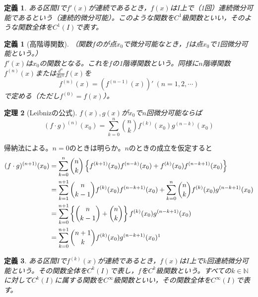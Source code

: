 \documentclass[dvipdfmx,a4j,10pt]{jsarticle}
\makeatletter
\theoremstyle{mystyle1}
\newtheorem{dfn}{定義}[part]
\newtheorem{thm}[dfn]{定理}
\theoremstyle{mystyle2}
\newtheorem{dfn*}{定義}
\renewenvironment{proof}[1][\proofname]{\par
  \pushQED{\qed}%
  \normalfont
  \topsep6\p@\@plus6\p@ \trivlist
  \item[\hskip\labelsep{\bfseries\sffamily #1}]\ignorespaces
}{%
  \popQED\endtrivlist\@endpefalse
}
\renewcommand\proofname{証明}
\makeatother
\begin{document}
\begin{framed}
\begin{dfn}\label{def7.5}
ある区間$I$で$f'(x)$が連続であるとき，$f(x)$は$I$上で（1回）連続微分可能であるという（連続的微分可能）。このような関数を$C^1$級関数といい，そのような関数全体を$C^1(I)$で表す。
\end{dfn}
\end{framed}
\begin{dfn*}[高階導関数]（関数$f$のが点$x_0$で微分可能なとき，$f$は点$x_0$で1回微分可能という。）\\
    $f'(x)$は$x_0$の関数となる。これを$f$の1階導関数という。同様に$n$階導関数$f^{(n)}(x)$または$\displaystyle \frac{d^n}{dx^n}f(x)$を
    \[
    f^{(n)}(x)=(f^{(n-1)}(x))'\ (n=1,2,\cdots)
    \]
    で定める（ただし$f^{(0)}=f(x)$）。
\end{dfn*}

\begin{framed}
    \begin{thm}[Leibnizの公式]\label{thm7.6}
        $f(x),g(x)$が$x_0$で$n$回微分可能ならば
        \[
        (f\cdot g)^{(n)}(x_0)=\sum_{k=0}^{n}\binom{n}{k}f^{(k)}(x_0)g^{(n-k)}(x_0)
        \]
    \end{thm}
\end{framed}

\begin{proof}[定理\ref{thm7.6}の証明]
    帰納法による。$n=0$のときは明らか。$n$のときの成立を仮定すると
    \[
    \begin{split}
    (f\cdot g)^{(n+1)}(x_0)
    &=\sum_{k=0}^{n}\binom{n}{k}\left\{f^{(k+1)}(x_0)f^{(n-k)}(x_0)+f^{(k)}(x_0)f^{(n-k+1)}(x_0)\right\}\\
    &=\sum_{k=1}^{n+1}\binom{n}{k-1}f^{(k)}(x_0)f^{(n-k+1)}(x_0)+\sum_{k=0}^{n}\binom{n}{k}f^{(k)}(x_0)g^{(n-k+1)}(x_0)\\
    &=\sum_{k=0}^{n+1}\left\{\binom{n}{k-1}+\binom{n}{k}\right\}f^{(k)}(x_0)g^{(n-k+1)}(x_0)\\
    &=\sum_{k=0}^{n+1}\binom{n+1}{k}f^{(k)}(x_0)g^{(n-k+1)}(x_0)
    \footnotemark
    \end{split}
    \]
\end{proof}

\begin{framed}
    \begin{dfn}
        ある区間$I$で$f^{(k)}(x)$が連続であるとき，$f(x)$は$I$上で$k$回連続微分可能という。その関数全体を$C^k(I)$で表し，$f$を$C^k$級関数という。すべての$k\in\mathbb{N}$に対して$C^k(I)$に属する関数を$C^\infty$級関数といい，その関数全体を$C^\infty(I)$で表す。\footnotemark
    \end{dfn}
\end{framed}
\end{document}
